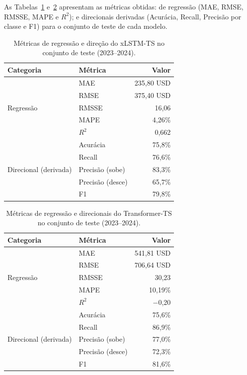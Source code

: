 As Tabelas~\ref{tab:xlstm_metricas} e~\ref{tab:transformer_metricas} apresentam as métricas obtidas: de regressão (MAE, RMSE, RMSSE, MAPE e $R^2$); e direcionais derivadas (Acurácia, Recall, Precisão por classe e F1) para o conjunto de teste de cada modelo.

\begin{table}[H]
\centering
\caption{Métricas de regressão e direção do xLSTM-TS no conjunto de teste (2023--2024).}
\label{tab:xlstm_metricas}
\begin{tabular}{@{}llr@{}}
\toprule
\textbf{Categoria} & \textbf{Métrica} & \textbf{Valor} \\
\midrule
\multirow{5}{*}{Regressão} 
 & MAE   & 235,80 USD \\
 & RMSE  & 375,40 USD \\
 & RMSSE & 16,06 \\
 & MAPE  & 4,26\% \\
 & $R^2$ & 0,662 \\
\midrule
\multirow{5}{*}{Direcional (derivada)}
 & Acurácia          & 75,8\% \\
 & Recall            & 76,6\% \\
 & Precisão (sobe)   & 83,3\% \\
 & Precisão (desce)  & 65,7\% \\
 & F1                & 79,8\% \\
\bottomrule
\end{tabular}
\end{table}

\begin{table}[H]
\centering
\caption{Métricas de regressão e direcionais do Transformer-TS no conjunto de teste (2023--2024).}
\label{tab:transformer_metricas}
\begin{tabular}{@{}llr@{}}
\toprule
\textbf{Categoria} & \textbf{Métrica} & \textbf{Valor} \\
\midrule
\multirow{5}{*}{Regressão}
 & MAE   & 541,81 USD \\
 & RMSE  & 706,64 USD \\
 & RMSSE & 30,23 \\
 & MAPE  & 10,19\% \\
 & $R^2$ & $-$0,20 \\
\midrule
\multirow{5}{*}{Direcional (derivada)}
 & Acurácia          & 75,6\% \\
 & Recall            & 86,9\% \\
 & Precisão (sobe)   & 77,0\% \\
 & Precisão (desce)  & 72,3\% \\
 & F1                & 81,6\% \\
\bottomrule
\end{tabular}
\end{table}

